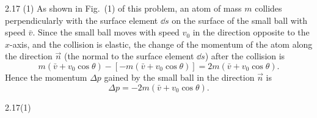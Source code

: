 \begin{solution}{2.17}
(1) As shown in Fig.~(1) of this problem, an atom of mass $m$ collides perpendicularly with the surface element $\dd s$ on the surface of the small ball with speed $\bar{v}$. Since the small ball moves with speed $v_0$ in the direction opposite to the $x$-axis, and the collision is elastic, the change of the momentum of the atom along the direction $\vec{n}$ (the normal to the surface element $\dd s$) after the collision is
\[
m(\bar{v}+v_0\cos\theta)-[-m(\bar{v}+v_0\cos\theta)]=2m(\bar{v}+v_0\cos\theta).
\]
Hence the momentum $\Delta p$ gained by the small ball in the direction $\vec{n}$ is
\begin{equation}
\Delta p=-2m(\bar{v}+v_0\cos\theta). \tag{1}
\end{equation}

\begin{figbox}{2.17(1)}
\end{figbox}


\end{solution}
